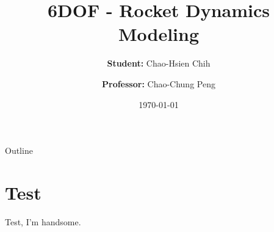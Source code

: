 \documentclass[10pt,xcolor={x11names}]{beamer}
\title[6DOF - Rocket Dynamics Modeling]{6DOF - Rocket Dynamics Modeling}
\author[P46104269@gs.ncku.edu.tw]{\textbf{Student:} Chao-Hsien Chih \and \textbf{Professor:} Chao-Chung Peng }
\institute[NCKU-IAA IEC-Lab] %
{

    \begin{tabular}{cc}
        \begin{minipage}{0.15\linewidth}
            \begin{figure}
                \texttt{[image: IEC\_Lab\_Logo.png]}
            \end{figure}
        \end{minipage}
        &
        \begin{minipage}{0.6\linewidth}
            Intelligent Embedded Control Lab (IEC-Lab) \\
            Department of Aeronautics and Astronautics \\
            National Cheng Kung University \\
            Tainan, Taiwan 
        \end{minipage}
    \end{tabular}
}
\date{\today}
\begin{document}
\begin{frame}
    \maketitle
\end{frame}

\begin{frame}{Outline}
    \tableofcontents
\end{frame}

\section{Test}

\begin{frame}
    Test, I'm handsome.
\end{frame}
\end{document}

